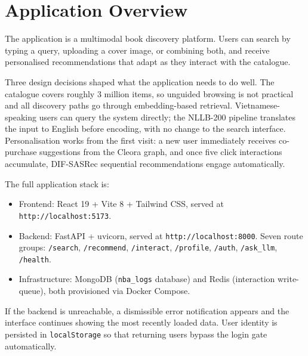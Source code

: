 \section{Application Overview}
\label{sec:app_overview}

The application is a multimodal book discovery platform. Users can search by typing a query, uploading a cover image, or combining both, and receive personalised recommendations that adapt as they interact with the catalogue.

Three design decisions shaped what the application needs to do well.
The catalogue covers roughly 3 million items, so unguided browsing is not practical and all discovery paths go through embedding-based retrieval.
Vietnamese-speaking users can query the system directly; the NLLB-200 pipeline translates the input to English before encoding, with no change to the search interface.
Personalisation works from the first visit: a new user immediately receives co-purchase suggestions from the Cleora graph, and once five click interactions accumulate, DIF-SASRec sequential recommendations engage automatically.

The full application stack is:
\begin{itemize}
    \item Frontend: React 19 + Vite 8 + Tailwind CSS, served at \texttt{http://localhost:5173}.
    \item Backend: FastAPI + uvicorn, served at \texttt{http://localhost:8000}. Seven route groups: \texttt{/search}, \texttt{/recommend}, \texttt{/interact}, \texttt{/profile}, \texttt{/auth}, \texttt{/ask\_llm}, \texttt{/health}.
    \item Infrastructure: MongoDB (\texttt{nba\_logs} database) and Redis (interaction write-queue), both provisioned via Docker Compose.
\end{itemize}

If the backend is unreachable, a dismissible error notification appears and the interface continues showing the most recently loaded data.
User identity is persisted in \texttt{localStorage} so that returning users bypass the login gate automatically.
